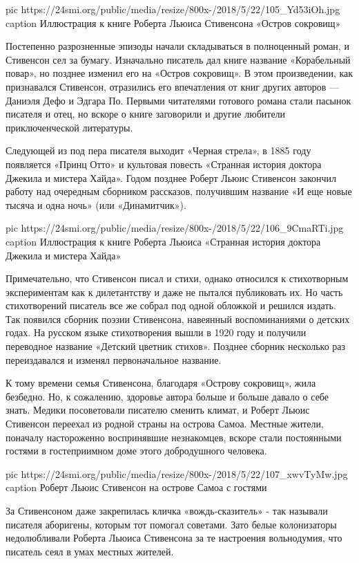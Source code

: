 \ifcmt
pic https://24smi.org/public/media/resize/800x-/2018/5/22/105_Yd53iOh.jpg
caption Иллюстрация к книге Роберта Льюиса Стивенсона «Остров сокровищ»
\fi

Постепенно разрозненные эпизоды начали складываться в полноценный роман, и
Стивенсон сел за бумагу. Изначально писатель дал книге название
«Корабельный повар», но позднее изменил его на «Остров сокровищ». В этом
произведении, как признавался Стивенсон, отразились его впечатления от
книг других авторов — Даниэля Дефо и Эдгара По. Первыми читателями
готового романа стали пасынок писателя и отец, но вскоре о книге
заговорили и другие любители приключенческой литературы.

Следующей из под пера писателя выходит «Черная стрела», в 1885 году
появляется «Принц Отто» и культовая повесть «Странная история доктора
Джекила и мистера Хайда». Годом позднее Роберт Льюис Стивенсон закончил
работу над очередным сборником рассказов, получившим название «И еще новые
тысяча и одна ночь» (или «Динамитчик»).

\ifcmt
pic https://24smi.org/public/media/resize/800x-/2018/5/22/106_9CmaRTi.jpg
caption Иллюстрация к книге Роберта Льюиса «Странная история доктора Джекила и мистера Хайда»
\fi


Примечательно, что Стивенсон писал и стихи, однако относился к стихотворным
экспериментам как к дилетантству и даже не пытался публиковать их. Но часть
стихотворений писатель все же собрал под одной обложкой и решился издать. Так
появился сборник поэзии Стивенсона, навеянный воспоминаниями о детских годах.
На русском языке стихотворения вышли в 1920 году и получили переводное название
«Детский цветник стихов».  Позднее сборник несколько раз переиздавался и
изменял первоначальное название.

К тому времени семья Стивенсона, благодаря «Острову сокровищ», жила безбедно.
Но, к сожалению, здоровье автора больше и больше давало о себе знать. Медики
посоветовали писателю сменить климат, и Роберт Льюис Стивенсон переехал из
родной страны на острова Самоа. Местные жители, поначалу настороженно
воспринявшие незнакомцев, вскоре стали постоянными гостями в гостеприимном доме
этого добродушного человека.

\ifcmt
pic https://24smi.org/public/media/resize/800x-/2018/5/22/107_xwvTyMw.jpg
caption Роберт Льюис Стивенсон на острове Самоа с гостями
\fi

За Стивенсоном даже закрепилась кличка «вождь-сказитель» - так называли
писателя аборигены, которым тот помогал советами. Зато белые колонизаторы
недолюбливали Роберта Льюиса Стивенсона за те настроения вольнодумия, что
писатель сеял в умах местных жителей.

